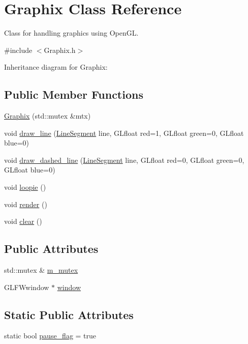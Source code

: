 \hypertarget{class_graphix}{}\section{Graphix Class Reference}
\label{class_graphix}


Class for handling graphics using Open\+GL.  




{\ttfamily \#include $<$Graphix.\+h$>$}



Inheritance diagram for Graphix\+:
\subsection*{Public Member Functions}
\begin{DoxyCompactItemize}
\item 
\mbox{\hyperlink{class_graphix_a1d4cb173e0d22fee13a657489b7b55de}{Graphix}} (std\+::mutex \&mtx)
\item 
void \mbox{\hyperlink{class_graphix_a74af1cd957a0fc3b5e0ee1f951a994e1}{draw\+\_\+line}} (\mbox{\hyperlink{class_line_segment}{Line\+Segment}} line, G\+Lfloat red=1, G\+Lfloat green=0, G\+Lfloat blue=0)
\item 
void \mbox{\hyperlink{class_graphix_a9a1ebf0c6d508ce4686b9794c4dec871}{draw\+\_\+dashed\+\_\+line}} (\mbox{\hyperlink{class_line_segment}{Line\+Segment}} line, G\+Lfloat red=0, G\+Lfloat green=0, G\+Lfloat blue=0)
\item 
void \mbox{\hyperlink{class_graphix_af7b539b3ab40274dc2f89d060cba0c51}{loopie}} ()
\item 
void \mbox{\hyperlink{class_graphix_a3e24075d5ded3741a9c14a7978b721d8}{render}} ()
\item 
void \mbox{\hyperlink{class_graphix_a1ac1a5725a869ef074da6fe3cab29b0e}{clear}} ()
\end{DoxyCompactItemize}
\subsection*{Public Attributes}
\begin{DoxyCompactItemize}
\item 
std\+::mutex \& \mbox{\hyperlink{class_graphix_ab2136667d30ca5f0017bceded579a803}{m\+\_\+mutex}}
\item 
G\+L\+F\+Wwindow $\ast$ \mbox{\hyperlink{class_graphix_a8189df95428d2fda74b1becb84ed07c2}{window}}
\end{DoxyCompactItemize}
\subsection*{Static Public Attributes}
\begin{DoxyCompactItemize}
\item 
static bool \mbox{\hyperlink{class_graphix_ab883fc83301f2a1a9d55b7ed8828bf66}{pause\+\_\+flag}} = true
\end{DoxyCompactItemize}


